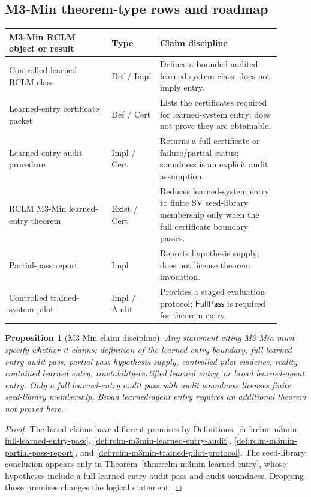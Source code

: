\documentclass[11pt,a4paper]{article}
\newtheorem{proposition}[theorem]{Proposition}
\begin{document}
\subsection{M3-Min theorem-type rows and roadmap}

\begin{center}
\begin{tabular}{@{}p{0.34\linewidth}p{0.16\linewidth}p{0.40\linewidth}@{}}
\toprule
\textbf{M3-Min RCLM object or result} & \textbf{Type} & \textbf{Claim discipline}\\
\midrule
Controlled learned RCLM class & Def / Impl & Defines a bounded audited learned-system class; does not imply entry.\\
Learned-entry certificate packet & Def / Cert & Lists the certificates required for learned-system entry; does not prove they are obtainable.\\
Learned-entry audit procedure & Impl / Cert & Returns a full certificate or failure/partial status; soundness is an explicit audit assumption.\\
RCLM M3-Min learned-entry theorem & Exist / Cert & Reduces learned-system entry to finite SV seed-library membership only when the full certificate boundary passes.\\
Partial-pass report & Impl & Reports hypothesis supply; does not license theorem invocation.\\
Controlled trained-system pilot & Impl / Audit & Provides a staged evaluation protocol; $\mathsf{FullPass}$ is required for theorem entry.\\
\bottomrule
\end{tabular}
\end{center}

\begin{proposition}[M3-Min claim discipline]
\label{prop:rclm-m3min-claim-discipline}
Any statement citing M3-Min must specify whether it claims: definition of the learned-entry boundary, full learned-entry audit pass, partial-pass hypothesis supply, controlled pilot evidence, reality-contained learned entry, tractability-certified learned entry, or broad learned-agent entry.  Only a full learned-entry audit pass with audit soundness licenses finite seed-library membership.  Broad learned-agent entry requires an additional theorem not proved here.
\end{proposition}

\begin{proof}
The listed claims have different premises by Definitions~\ref{def:rclm-m3min-full-learned-entry-pass}, \ref{def:rclm-m3min-learned-entry-audit}, \ref{def:rclm-m3min-partial-pass-report}, and \ref{def:rclm-m3min-trained-pilot-protocol}.  The seed-library conclusion appears only in Theorem~\ref{thm:rclm-m3min-learned-entry}, whose hypotheses include a full learned-entry audit pass and audit soundness.  Dropping those premises changes the logical statement.
\end{proof}
\end{document}
